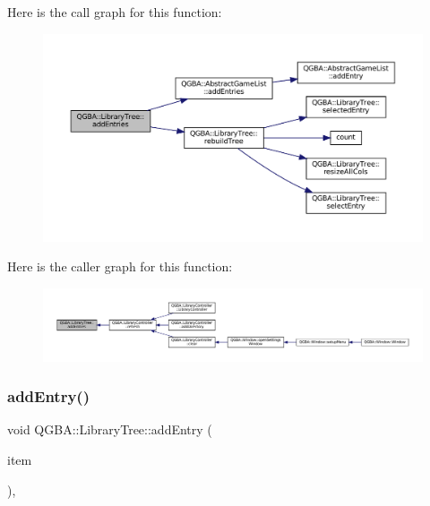 Here is the call graph for this function\+:
\nopagebreak
\begin{figure}[H]
\begin{center}
\leavevmode
\includegraphics[width=350pt]{class_q_g_b_a_1_1_library_tree_ad824322266cad285b9195ca1314b67b1_cgraph}
\end{center}
\end{figure}
Here is the caller graph for this function\+:
\nopagebreak
\begin{figure}[H]
\begin{center}
\leavevmode
\includegraphics[width=350pt]{class_q_g_b_a_1_1_library_tree_ad824322266cad285b9195ca1314b67b1_icgraph}
\end{center}
\end{figure}
\mbox{\label{class_q_g_b_a_1_1_library_tree_a36da639f0d8de0811da90f337ee403bd}} 
\subsubsection{\texorpdfstring{add\+Entry()}{addEntry()}}
{\footnotesize\ttfamily void Q\+G\+B\+A\+::\+Library\+Tree\+::add\+Entry (\begin{DoxyParamCaption}\item[{\mbox{\hyperlink{namespace_q_g_b_a_a201fa9f2cb8f778666a134ba81909358}{Library\+Entry\+Ref}}}]{item }\end{DoxyParamCaption})\hspace{0.3cm}{\ttfamily [override]}, {\ttfamily [virtual]}}



